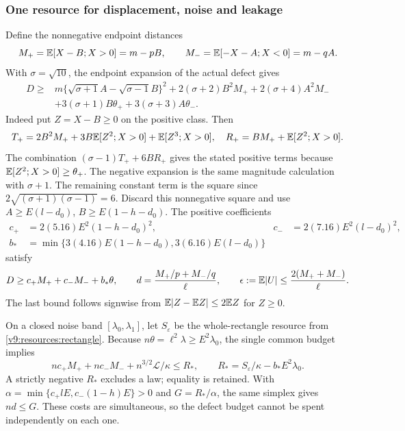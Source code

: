 \subsubsection{One resource for displacement, noise and leakage}
\label{v9:confinement:simplex}
Define the nonnegative endpoint distances
\[
 M_+=\mathbb E[X-B;X>0]=m-pB,\qquad M_-=\mathbb E[-X-A;X<0]=m-qA.
\]
With $\sigma=\sqrt{10}$, the endpoint expansion of the actual defect gives
\begin{align*}
 D\ge{}&m\{\sqrt{\sigma+1}A-\sqrt{\sigma-1}B\}^2
 +2(\sigma+2)B^2M_++2(\sigma+4)A^2M_-\\
 &+3(\sigma+1)B\theta_++3(\sigma+3)A\theta_-.
\end{align*}
Indeed put $Z=X-B\ge0$ on the positive class. Then
\[
 T_+=2B^2M_++3B\mathbb E[Z^2;X>0]+\mathbb E[Z^3;X>0],\quad
 R_+=BM_++\mathbb E[Z^2;X>0].
\]
The combination $(\sigma-1)T_++6BR_+$ gives the stated positive
terms because $\mathbb E[Z^2;X>0]\ge\theta_+$. The negative expansion is the
same magnitude calculation with $\sigma+1$. The remaining constant
term is the square since $2\sqrt{(\sigma+1)(\sigma-1)}=6$.
Discard this nonnegative square and use $A\ge E(l-d_0)$,
$B\ge E(1-h-d_0)$. The positive coefficients
\begin{align*}
 c_+&=2(5.16)E^2(1-h-d_0)^2,&c_-&=2(7.16)E^2(l-d_0)^2,\\
 b_*&=\min\{3(4.16)E(1-h-d_0),3(6.16)E(l-d_0)\}
\end{align*}
satisfy
\begin{equation}\label{v9:confinement:endpoint-cost}
 D\ge c_+M_++c_-M_-+b_*\theta,\qquad
 d=\frac{M_+/p+M_-/q}{\ell},\qquad
 \epsilon:=\mathbb E|U|\le\frac{2(M_++M_-)}\ell.
\end{equation}
The last bound follows signwise from
$\mathbb E|Z-\mathbb E Z|\le2\mathbb E Z$ for $Z\ge0$.

On a closed noise band $[\lambda_0,\lambda_1]$, let $S_\varepsilon$
be the whole-rectangle resource from \eqref{v9:resources:rectangle}.
Because $n\theta=\ell^2\lambda\ge E^2\lambda_0$, the single common
budget implies
\begin{equation}\label{v9:confinement:resource-simplex}
 nc_+M_++nc_-M_-+n^{3/2}\mathcal L/\kappa\le R_*,
 \qquad R_*=S_\varepsilon/\kappa-b_*E^2\lambda_0.
\end{equation}
A strictly negative $R_*$ excludes a law; equality is retained.
With $\alpha=\min\{c_+lE,c_-(1-h)E\}>0$ and $G=R_*/\alpha$, the
same simplex gives $nd\le G$. These costs are simultaneous, so the
defect budget cannot be spent independently on each one.

